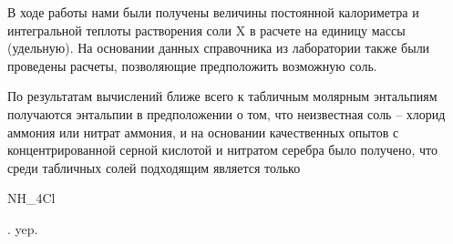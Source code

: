 \documentclass[a4paper]{article}
\begin{document}
В ходе работы нами были получены величины постоянной калориметра и интегральной теплоты растворения соли X в расчете на единицу массы (удельную). На основании данных справочника из лаборатории также были проведены расчеты, позволяющие предположить возможную соль.
\par \vspace{0.3 cm}
По результатам вычислений ближе всего к табличным молярным энтальпиям получаются энтальпии в предположении о том, что неизвестная соль -- хлорид аммония или нитрат аммония, и на основании качественных опытов с концентрированной серной кислотой и нитратом серебра было получено, что среди табличных солей подходящим является только \begin{mathmode} NH_4Cl \end{mathmode}.
yep.
\end{document}
